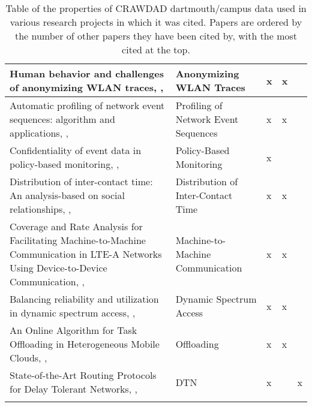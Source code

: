 \begin{longtable}{|p{3cm}|p{1.9cm}|p{1.7cm}|p{1.5cm}|p{1.9cm}|}
Human behavior and challenges of anonymizing WLAN traces, \citeauthor{Kumar2009}, \citeyear{Kumar2009}         & Anonymizing WLAN Traces            & x                          & x                     &                            \\ \hline
Automatic profiling of network event sequences: algorithm and applications, \citeauthor{Meng2008}, \citeyear{Meng2008}           &Profiling of Network Event Sequences& x                          & x                     &                            \\ \hline
Confidentiality of event data in policy-based monitoring, \citeauthor{Montanari2012}, \citeyear{Montanari2012} & Policy-Based Monitoring            & x                          &                       &                            \\ \hline
Distribution of inter-contact time: An analysis-based on social relationships, \citeauthor{Wei2013}, \citeyear{Wei2013}             & Distribution of Inter-Contact Time & x                          & x                     &                            \\ \hline
Coverage and Rate Analysis for Facilitating Machine-to-Machine Communication in LTE-A Networks Using Device-to-Device Communication, \citeauthor{Swain2017}, \citeyear{Swain2017}         & Machine-to-Machine Communication   & x                          & x                     &                            \\ \hline
Balancing reliability and utilization in dynamic spectrum access, \citeauthor{Cao2012}, \citeyear{Cao2012}             & Dynamic Spectrum Access            & x                          & x                     &                            \\ \hline
An Online Algorithm for Task Offloading in Heterogeneous Mobile Clouds, \citeauthor{Zhou2018}, \citeyear{Zhou2018}           & Offloading                         & x                          & x                     &                            \\ \hline
State-of-the-Art Routing Protocols for Delay Tolerant Networks, \citeauthor{Feng2012}, \citeyear{Feng2012}          & DTN                                 & x                          &                       & x                          \\ \hline

\captionsetup{width=\textwidth}
\caption{Table of the properties of CRAWDAD dartmouth/campus data used in various research projects in which it was cited. Papers are ordered by the number of other papers they have been cited by, with the most cited at the top.}
\label{usageTable}
\end{longtable}